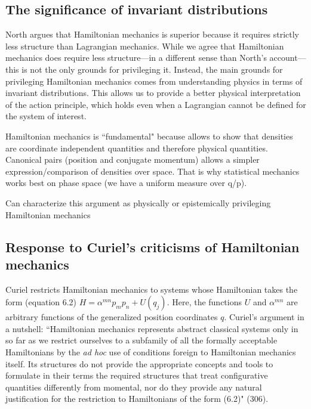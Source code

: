 \documentclass[letterpaper]{article}
\begin{document}
\subsection{The significance of invariant distributions}

North argues that Hamiltonian mechanics is superior because it requires strictly less structure than Lagrangian mechanics. While we agree that Hamiltonian mechanics does require less structure---in a different sense than North's account---this is not the only grounds for privileging it. Instead, the main grounds for privileging Hamiltonian mechanics comes from understanding physics in terms of invariant distributions. This allows us to provide a better physical interpretation of the action principle, which holds even when a Lagrangian cannot be defined for the system of interest.

Hamiltonian mechanics is ``fundamental" because allows to show that densities are coordinate independent quantities and therefore physical quantities. Canonical pairs (position and conjugate momentum) allows a simpler expression/comparison of densities over space. That is why statistical mechanics works best on phase space (we have a uniform measure over q/p).

Can characterize this argument as physically or epistemically privileging Hamiltonian mechanics 

\subsection{Response to Curiel's criticisms of Hamiltonian mechanics}



Curiel restricts Hamiltonian mechanics to systems whose Hamiltonian takes the form (equation 6.2) $H =\alpha^{m n} p_m p_n + U (q_j) $. Here, the functions $U$ and $\alpha^{m n}$ are arbitrary functions of the generalized position coordinates $q $. Curiel's argument in a nutshell:  ``Hamiltonian mechanics represents abstract classical systems only in so far as we restrict ourselves to a subfamily of all the formally acceptable Hamiltonians by the \textit{ad hoc} use of conditions foreign to Hamiltonian mechanics itself. Its structures do not provide the appropriate concepts and tools to formulate in their terms the required structures that treat configurative quantities differently from momental, nor do they provide any natural justification for the restriction to Hamiltonians of the form (6.2)" (306). 
\end{document}
